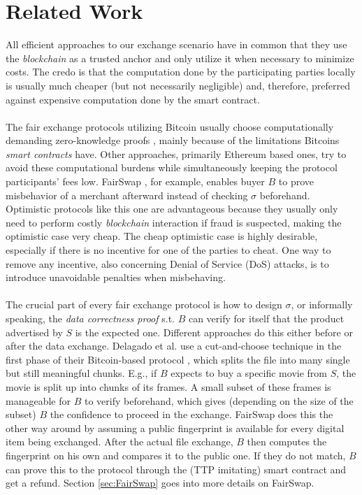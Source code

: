 \documentclass{cacthesis}
\newcounter{protocol}
\begin{document}
        \section{Related Work}
        \label{sec:relatedWork}
        All efficient approaches to our exchange scenario have in common that they use the \textit{blockchain} as a trusted anchor and only utilize it when necessary to minimize costs. The credo is that the computation done by the participating parties locally is usually much cheaper (but not necessarily negligible) and, therefore, preferred against expensive computation done by the smart contract. \\\\
        The fair exchange protocols utilizing Bitcoin usually choose computationally demanding zero-knowledge proofs \cite{zkcp}\cite{DELGADOSEGURA2020832}, mainly because of the limitations Bitcoins \textit{smart contracts} have. Other approaches, primarily Ethereum based ones, try to avoid these computational burdens while simultaneously keeping the protocol participants' fees low. FairSwap \cite{10.1145/3243734.3243857}, for example, enables buyer $B$ to prove misbehavior of a merchant afterward instead of checking $\sigma$ beforehand. Optimistic protocols like this one are advantageous because they usually only need to perform costly \textit{blockchain} interaction if fraud is suspected, making the optimistic case very cheap. The cheap optimistic case is highly desirable, especially if there is no incentive for one of the parties to cheat. One way to remove any incentive, also concerning Denial of Service (DoS) attacks, is to introduce unavoidable penalties when misbehaving. \\\\
        The crucial part of every fair exchange protocol is how to design $\sigma$, or informally speaking, the \textit{data correctness proof} s.t. $B$ can verify for itself that the product advertised by $S$ is the expected one. Different approaches do this either before or after the data exchange. Delagado et al. use a cut-and-choose technique in the first phase of their Bitcoin-based protocol \cite{DELGADOSEGURA2020832}, which splits the file into many single but still meaningful chunks. E.g., if $B$ expects to buy a specific movie from $S$, the movie is split up into chunks of its frames. A small subset of these frames is manageable for $B$ to verify beforehand, which gives (depending on the size of the subset) $B$ the confidence to proceed in the exchange. FairSwap does this the other way around by assuming a public fingerprint is available for every digital item being exchanged. After the actual file exchange, $B$ then computes the fingerprint on his own and compares it to the public one. If they do not match, $B$ can prove this to the protocol through the (TTP imitating) smart contract and get a refund. Section \ref{sec:FairSwap} goes into more details on FairSwap.
\end{document}
